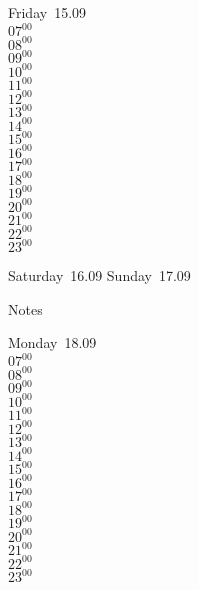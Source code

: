 \documentclass[11pt, a4paper]{book}\usepackage[]{graphicx}\usepackage[]{color}
\begin{document}
\begin{weekdaybox}
  Friday~15.09\\
  { 
  \vfill
  $07^{00}$\\
$08^{00}$\\
$09^{00}$\\
$10^{00}$\\
$11^{00}$\\
$12^{00}$\\
$13^{00}$\\
$14^{00}$\\
$15^{00}$\\
$16^{00}$\\
$17^{00}$\\
$18^{00}$\\
$19^{00}$\\
$20^{00}$\\
$21^{00}$\\
$22^{00}$\\
$23^{00}$\\
  }
\end{weekdaybox}
\begin{weekendbox}
  Saturday~16.09
  \tcblower
  Sunday~17.09
\end{weekendbox} %
\begin{notebox}
  Notes
\end{notebox}
\clearpage
\begin{headerbox}
\end{headerbox}
\begin{weekdaybox}
  Monday~18.09\\
  { 
  \vfill
  $07^{00}$\\
$08^{00}$\\
$09^{00}$\\
$10^{00}$\\
$11^{00}$\\
$12^{00}$\\
$13^{00}$\\
$14^{00}$\\
$15^{00}$\\
$16^{00}$\\
$17^{00}$\\
$18^{00}$\\
$19^{00}$\\
$20^{00}$\\
$21^{00}$\\
$22^{00}$\\
$23^{00}$\\
  }
\end{weekdaybox}
\end{document}
